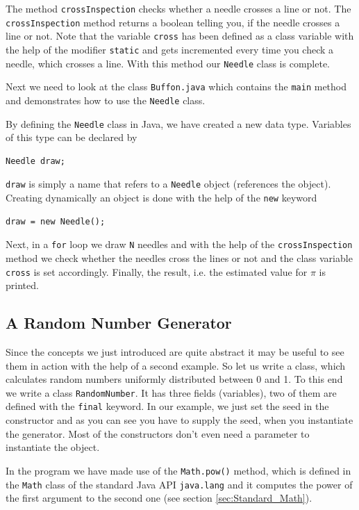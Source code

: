 The method \verb|crossInspection| checks whether
a needle crosses a line or not. The \verb|crossInspection| method
returns a boolean telling you, if the needle crosses a line or not.
Note that the variable \verb|cross| has
been defined as a class variable with the help of the modifier \verb|static|
and gets incremented every time you check a needle, which crosses a line.
With this method our \verb|Needle| class is complete.

Next we need to look at the class \verb|Buffon.java| which contains the
\verb|main| method and demonstrates how to use the \verb|Needle| class.

By defining the \verb|Needle| class in Java, we have created a new
data type. Variables of this type can be declared by
\begin{verbatim}
Needle draw;
\end{verbatim}
\verb|draw| is simply a name that refers to a \verb|Needle|
object (references the object). 
Creating dynamically an object
is done with the help of the \verb|new| keyword
\begin{verbatim}
draw = new Needle();
\end{verbatim}
Next, in a \verb|for| loop we draw \verb|N|  needles and with the help
of the \verb|crossInspection| method we check whether the needles
cross the lines or not and the class variable \verb|cross| is set
accordingly. Finally, the result, i.e. the estimated value
for $\pi$ is printed.


\subsection{A Random Number Generator}
Since the concepts we just introduced are quite abstract it may be
useful to see them in action with the help of a second example.
So let us write a class, which calculates random numbers uniformly
distributed between 0 and 1. To this end we write a class
\verb|RandomNumber|. It has three fields (variables), two of them are
defined with the \verb|final| keyword.
In our example, we just set the seed in the constructor and as 
you can see you have to supply the seed, when you instantiate the
generator. Most of the constructors don't even need a parameter to 
instantiate the object. 

In the program we have made use of the \verb|Math.pow()| method, 
which is defined in the \verb|Math| class of the standard
Java API \verb|java.lang| and it computes the power of the first
argument to the second one (see section \ref{sec:Standard_Math}).

